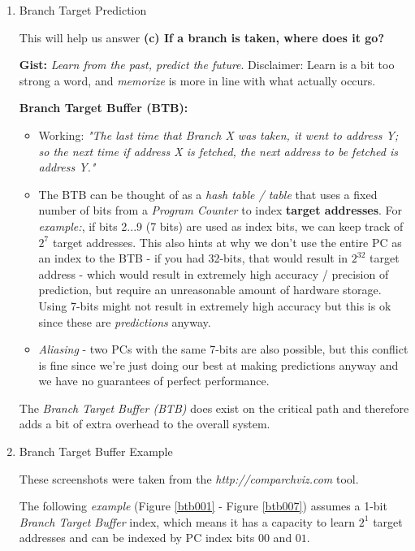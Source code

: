 \documentclass[12pt]{article}
\newenvironment{QandA}{\begin{enumerate}[label=\bfseries\alph*.]\bfseries}
                      {\end{enumerate}}
\newenvironment{answered}{\par\quad\normalfont}{}
\begin{document}
\begin{QandA}
\begin{answered}
\end{answered}

\item Branch Target Prediction
\begin{answered}
This will help us answer \textbf{(c) If a branch is taken, where does it go?}

\textbf{Gist:} \textit{Learn from the past, predict the future}. Disclaimer: Learn is a bit too strong a word, and \textit{memorize} is more in line with what actually occurs.

\textbf{Branch Target Buffer (BTB):}
\begin{itemize}
    \item Working: \textit{"The last time that Branch X was taken, it went to address Y; so the next time if address X is fetched, the next address to be fetched is address Y."}
    \item The BTB can be thought of as a \textit{hash table / table} that uses a fixed number of bits from a \textit{Program Counter} to index \textbf{target addresses}. For \textit{example:}, if bits 2$...$9 (7 bits) are used as index bits, we can keep track of $2^{7}$ target addresses. This also hints at why we don't use the entire PC as an index to the BTB - if you had 32-bits, that would result in $2^{32}$ target address - which would result in extremely high accuracy / precision of prediction, but require an unreasonable amount of hardware storage. Using 7-bits might not result in extremely high accuracy but this is ok since these are \textit{predictions} anyway.
    \item \textit{Aliasing} - two PCs with the same 7-bits are also possible, but this conflict is fine since we're just doing our best at making predictions anyway and we have no guarantees of perfect performance.
\end{itemize}

The \textit{Branch Target Buffer (BTB)} does exist on the critical path and therefore adds a bit of extra overhead to the overall system. 
\end{answered}

\item Branch Target Buffer Example
\begin{answered}
These screenshots were taken from the \textit{http://comparchviz.com} tool.

The following \textit{example} (Figure \ref{btb001} - Figure \ref{btb007}) assumes a 1-bit \textit{Branch Target Buffer} index, which means it has a capacity to learn $2^{1}$ target addresses and can be indexed by PC index bits $00$ and $01$.


\end{answered}
\end{QandA}
\end{document}
